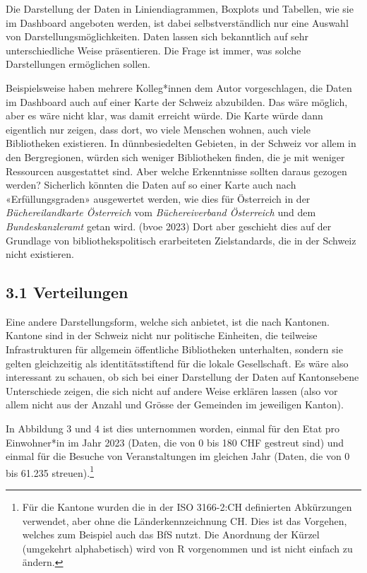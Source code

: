 \documentclass[a4paper,
fontsize=11pt,
oneside,
numbers=noperiodatend,
parskip=half-,
bibliography=totoc,
final
]{scrartcl}
\begin{document}
Die Darstellung der Daten in Liniendiagrammen, Boxplots und Tabellen,
wie sie im Dashboard angeboten werden, ist dabei selbstverständlich nur
eine Auswahl von Darstellungsmöglichkeiten. Daten lassen sich
bekanntlich auf sehr unterschiedliche Weise präsentieren. Die Frage ist
immer, was solche Darstellungen ermöglichen sollen.

Beispielsweise haben mehrere Kolleg*innen dem Autor vorgeschlagen, die
Daten im Dashboard auch auf einer Karte der Schweiz abzubilden. Das wäre
möglich, aber es wäre nicht klar, was damit erreicht würde. Die Karte
würde dann eigentlich nur zeigen, dass dort, wo viele Menschen wohnen,
auch viele Bibliotheken existieren. In dünnbesiedelten Gebieten, in der
Schweiz vor allem in den Bergregionen, würden sich weniger Bibliotheken
finden, die je mit weniger Ressourcen ausgestattet sind. Aber welche
Erkenntnisse sollten daraus gezogen werden? Sicherlich könnten die Daten
auf so einer Karte auch nach «Erfüllungsgraden» ausgewertet werden, wie
dies für Österreich in der \emph{Büchereilandkarte Österreich} vom
\emph{Büchereiverband Österreich} und dem \emph{Bundeskanzleramt} getan
wird. (bvoe 2023) Dort aber geschieht dies auf der Grundlage von
bibliothekspolitisch erarbeiteten Zielstandards, die in der Schweiz
nicht existieren.

\subsection{3.1 Verteilungen}\label{verteilungen}

Eine andere Darstellungsform, welche sich anbietet, ist die nach
Kantonen. Kantone sind in der Schweiz nicht nur politische Einheiten,
die teilweise Infrastrukturen für allgemein öffentliche Bibliotheken
unterhalten, sondern sie gelten gleichzeitig als identitätsstiftend für
die lokale Gesellschaft. Es wäre also interessant zu schauen, ob sich
bei einer Darstellung der Daten auf Kantonsebene Unterschiede zeigen,
die sich nicht auf andere Weise erklären lassen (also vor allem nicht
aus der Anzahl und Grösse der Gemeinden im jeweiligen Kanton).

In Abbildung 3 und 4 ist dies unternommen worden, einmal für den Etat
pro Einwohner*in im Jahr 2023 (Daten, die von 0 bis 180 CHF gestreut
sind) und einmal für die Besuche von Veranstaltungen im gleichen Jahr
(Daten, die von 0 bis 61.235 streuen).\footnote{Für die Kantone wurden
  die in der ISO 3166-2:CH definierten Abkürzungen verwendet, aber ohne
  die Länderkennzeichnung CH. Dies ist das Vorgehen, welches zum
  Beispiel auch das BfS nutzt. Die Anordnung der Kürzel (umgekehrt
  alphabetisch) wird von R vorgenommen und ist nicht einfach zu ändern.}
\end{document}
